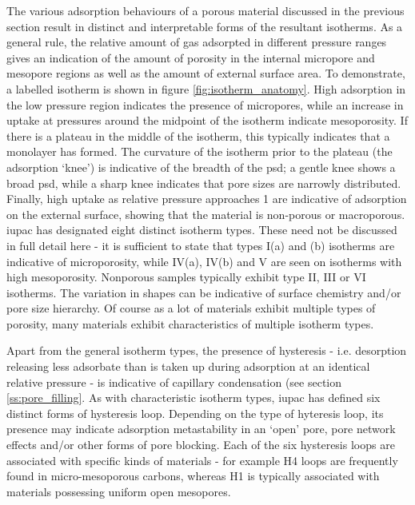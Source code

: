 The various adsorption behaviours of a porous material discussed in the previous section result in distinct and interpretable forms of the resultant isotherms. As a general rule, the relative amount of gas adsorpted in different pressure ranges gives an indication of the amount of porosity in the internal \gls{micropore} and \gls{mesopore} regions as well as the amount of external surface area. To demonstrate, a labelled isotherm is shown in figure \ref{fig:isotherm_anatomy}. High adsorption in the low pressure region indicates the presence of \glspl{micropore}, while an increase in uptake at pressures around the midpoint of the isotherm indicate mesoporosity. If there is a plateau in the middle of the isotherm, this typically indicates that a monolayer has formed. The curvature of the isotherm prior to the plateau (the adsorption `knee') is indicative of the breadth of the \acrshort{psd}; a gentle knee shows a broad \acrshort{psd}, while a sharp knee indicates that pore sizes are narrowly distributed. Finally, high uptake as relative pressure approaches 1 are indicative of adsorption on the external surface, showing that the material is non-porous or macroporous.\citep{Thommes2015Physisorption} \acrshort{iupac} has designated eight distinct isotherm types.\citep{Thommes2015Physisorption, Sing1985} These need not be discussed in full detail here - it is sufficient to state that types I(a) and (b) isotherms are indicative of microporosity, while IV(a), IV(b) and V are seen on isotherms with high mesoporosity. Nonporous samples typically exhibit type II, III or VI isotherms. The variation in shapes can be indicative of surface chemistry and/or pore size hierarchy.\citep{thommes2014physical, monson2012understanding} Of course as a lot of materials exhibit multiple types of porosity, many materials exhibit characteristics of multiple isotherm types.\citep{Thommes2015Physisorption} 

Apart from the general isotherm types, the presence of hysteresis - i.e. desorption releasing less \gls{adsorbate} than is taken up during adsorption at an identical relative pressure - is indicative of capillary condensation (see section \ref{ss:pore_filling}.\citep{thommes2014physical, monson2012understanding, landers2013density} As with characteristic isotherm types, \acrshort{iupac} has defined six distinct forms of hysteresis loop. Depending on the type of hyteresis loop, its presence may indicate adsorption metastability in an `open' pore, pore network effects and/or other forms of pore blocking.\citep{Thommes2015Physisorption} Each of the six hysteresis loops are associated with specific kinds of materials - for example H4 loops are frequently found in micro-mesoporous carbons, whereas H1 is typically associated with materials possessing uniform open mesopores.\citep{Thommes2015Physisorption, monson2012understanding}  

